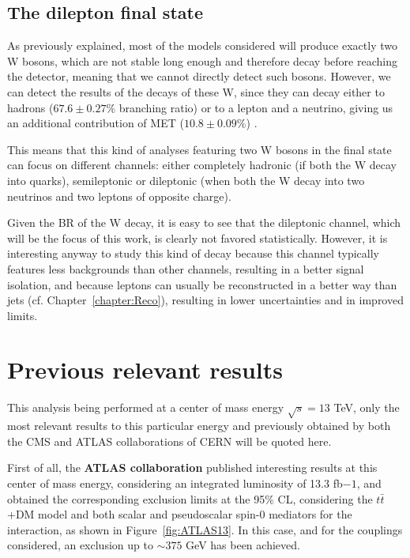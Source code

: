 \documentclass[a4paper, 10pt, openright]{report}
\begin{document}
\subsection{The dilepton final state} \label{subsection:diLeptonFS}

As previously explained, most of the models considered will produce exactly two W bosons, which are not stable long enough and therefore decay before reaching the detector, meaning that we cannot directly detect such bosons. However, we can detect the results of the decays of these W, since they can decay either to hadrons ($67.6 \pm 0.27 \%$ branching ratio) or to a lepton and a neutrino, giving us an additional contribution of \ac{MET} ($10.8 \pm 0.09 \%$) \cite{PDG}.

This means that this kind of analyses featuring two W bosons in the final state can focus on different channels: either completely hadronic (if both the W decay into quarks), semileptonic or dileptonic (when both the W decay into two neutrinos and two leptons of opposite charge). 

Given the \ac{BR} of the W decay, it is easy to see that the dileptonic channel, which will be the focus of this work, is clearly not favored statistically. However, it is interesting anyway to study this kind of decay because this channel typically features less backgrounds than other channels, resulting in a better signal isolation, and because leptons can usually be reconstructed in a better way than jets (cf. Chapter~\ref{chapter:Reco}), resulting in lower uncertainties and in improved limits.

\section{Previous relevant results} \label{section:PreviousResults}

This analysis being performed at a center of mass energy $\sqrt{s} = 13$ TeV, only the most relevant results to this particular energy and previously obtained by both the \ac{CMS} and \ac{ATLAS} collaborations of \ac{CERN} will be quoted here. 

First of all, the \textbf{\ac{ATLAS} collaboration} published interesting results at this center of mass energy, considering an integrated luminosity of 13.3 fb${-1}$, and obtained the corresponding exclusion limits at the 95\% \ac{CL}, considering the $t \bar t$+DM model and both scalar and pseudoscalar spin-0 mediators for the interaction, as shown in Figure~\ref{fig:ATLAS13}. In this case, and for the couplings considered, an exclusion up to $\sim 375$ GeV has been achieved.
\end{document}
